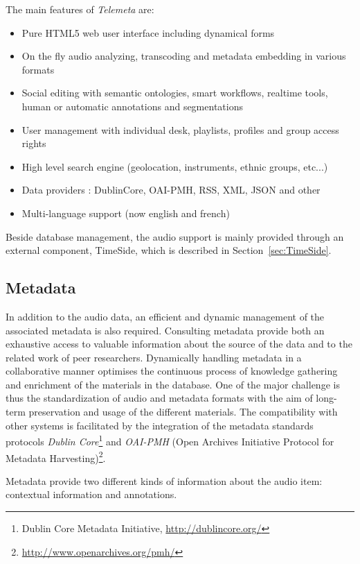 \documentclass{paper}
\begin{document}
The main features of \emph{Telemeta} are:

      \begin{itemize}
      \item Pure HTML5 web user interface including dynamical forms
      \item On the fly audio analyzing, transcoding and metadata
        embedding in various formats
      \item Social editing with semantic ontologies, smart workflows,
        realtime tools, human or automatic annotations and
        segmentations
      \item User management with individual desk, playlists, profiles
        and group access rights
      \item High level search engine (geolocation, instruments, ethnic groups, etc...)
      \item Data providers : DublinCore, OAI-PMH, RSS, XML, JSON and other 
      \item Multi-language support (now english and french)
      \end{itemize}

Beside database management, the audio support is mainly provided through an external component, TimeSide, which is described in Section~\ref{sec:TimeSide}.

\subsection{Metadata}\label{sec:metadata}
In addition to the audio data, an efficient and dynamic management of the associated metadata is also required. Consulting metadata provide both an exhaustive access to valuable information about the source of the data and to the related work of peer researchers. 
Dynamically handling metadata in a collaborative manner optimises the continuous process of knowledge gathering and enrichment of the materials in the database.  
One of the major challenge is thus the standardization of audio and metadata formats with the aim of long-term preservation and usage of the different materials.
The compatibility with other systems is facilitated by the integration of the metadata standards protocols \emph{Dublin Core}\footnote{{Dublin Core} Metadata Initiative, \url{http://dublincore.org/}} and \emph{OAI-PMH} (Open Archives Initiative Protocol for Metadata Harvesting)\footnote{\url{http://www.openarchives.org/pmh/}}.

Metadata provide two different kinds of information about the audio item: contextual information and annotations.
\end{document}
